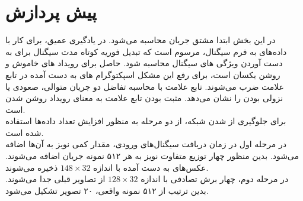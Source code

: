 \documentclass[12pt,onecolumn,a4paper]{article}
\begin{document}
\section{پیش پردازش}
در این بخش ابتدا مشتق جریان  محاسبه می‌شود. در یادگیری عمیق، برای کار با داده‌های به فرم سیگنال، مرسوم است که تبدیل فوریه کوتاه مدت سیگنال برای به دست آوردن ویژگی های سیگنال محاسبه شود. 
حاصل برای رویداد های خاموش و روشن یکسان است، برای رفع این مشکل اسپکتوگرام های به دست آمده در تابع علامت ضرب می‌شوند. تابع علامت با محاسبه تفاضل دو جریان  متوالی، صعودی یا نزولی بودن را نشان می‌دهد. مثبت بودن تابع علامت به معنای رویداد روشن شدن است.\\
برای جلوگیری از 
شدن شبکه، از دو مرحله 
به منظور افزایش تعداد داده‌ها استفاده شده است. \\
در مرحله اول در زمان دریافت سیگنال‌‌های ورودی، مقدار کمی نویز به آن‌ها اضافه می‌شود. بدین منظور چهار توزیع متفاوت نویز به هر ۵۱۲ نمونه جریان  اضافه می‌شوند. عکس‌های به دست آمده با اندازه
$148 \times 32$
ذخیره می‌شوند.
\\
در مرحله دوم، چهار برش تصادفی با اندازه 
$128 \times 32$
از تصاویر قبلی جدا می‌شوند. بدین ترتیب از ۵۱۲ نمونه واقعی، ۲۰ تصویر تشکیل می‌شود.
\end{document}
